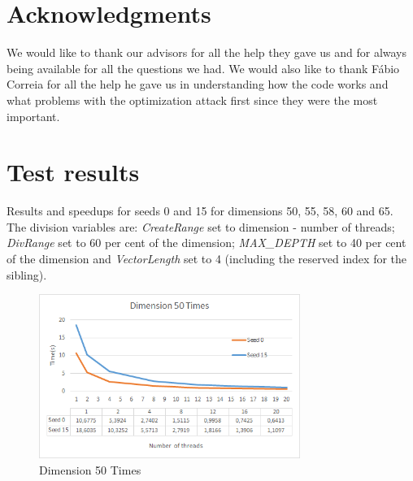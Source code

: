\documentclass[conference]{IEEEtran}
\begin{document}
\section*{Acknowledgments}
We would like to thank our advisors for all the help they gave us and for always being available for all the questions we had. 
We would also like to thank Fábio Correia for all the help he gave us in understanding how the code works and what problems with the optimization attack first since they were the most important. 

\printbibliography
\nocite{latticeAverage}
\nocite{fabio}
\nocite{parallel}



\clearpage
\appendices
\section{Test results}
Results and speedups for seeds 0 and 15 for dimensions 50, 55, 58, 60 and 65. The division variables are: \emph{CreateRange} set to dimension - number of threads; \emph{DivRange} set to 60 per cent of the dimension; \emph{MAX\_DEPTH} set to 40 per cent of the dimension and \emph{VectorLength} set to 4 (including the reserved index for the sibling).

\begin{figure}[H]
\centering
\includegraphics[width=85mm]{TestesFinais/Dimension50Times}
\caption{Dimension 50 Times}
\end{figure}
\end{document}
